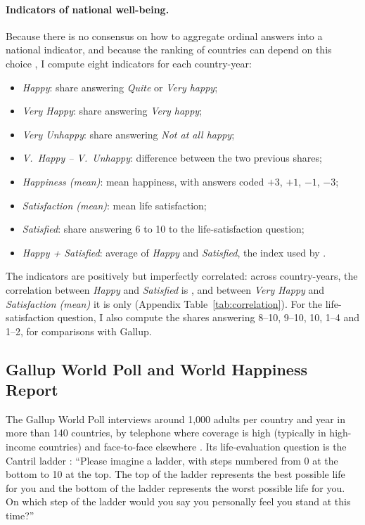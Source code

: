 \documentclass[12pt]{article}
\begin{document}
\paragraph{Indicators of national well-being.}
Because there is no consensus on how to aggregate ordinal answers into a national indicator, and because the ranking of countries can depend on this choice \citep{bond_sad_2019}, I compute eight indicators for each country-year:
\begin{itemize}
    \item \textit{Happy}: share answering \textit{Quite} or \textit{Very happy};
    \item \textit{Very Happy}: share answering \textit{Very happy};
    \item \textit{Very Unhappy}: share answering \textit{Not at all happy};
    \item \textit{V.~Happy -- V.~Unhappy}: difference between the two previous shares;
    \item \textit{Happiness (mean)}: mean happiness, with answers coded $+3$, $+1$, $-1$, $-3$;
    \item \textit{Satisfaction (mean)}: mean life satisfaction;
    \item \textit{Satisfied}: share answering 6 to 10 to the life-satisfaction question;
    \item \textit{Happy + Satisfied}: average of \textit{Happy} and \textit{Satisfied}, the index used by \citet{inglehart_genes_2000}.
\end{itemize}
The indicators are positively but imperfectly correlated: across country-years, the correlation between \textit{Happy} and \textit{Satisfied} is \corHappySatisfied, and between \textit{Very Happy} and \textit{Satisfaction (mean)} it is only \corVeryHappySatisfiedMean (Appendix Table~\ref{tab:correlation}). For the life-satisfaction question, I also compute the shares answering 8--10, 9--10, 10, 1--4 and 1--2, for comparisons with Gallup. 

\fi

\subsection{Gallup World Poll and World Happiness Report}\label{subsec:gallup}

The Gallup World Poll interviews around 1,000 adults per country and year in more than 140 countries, by telephone where coverage is high (typically in high-income countries) and face-to-face elsewhere \citep{gallup_methodology_2022}. Its life-evaluation question is the Cantril ladder \citep{cantril_pattern_1965}: ``Please imagine a ladder, with steps numbered from 0 at the bottom to 10 at the top. The top of the ladder represents the best possible life for you and the bottom of the ladder represents the worst possible life for you. On which step of the ladder would you say you personally feel you stand at this time?''
\end{document}
